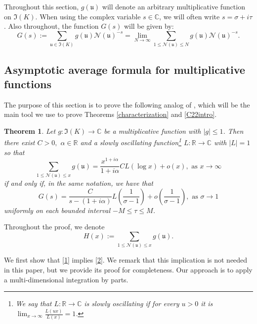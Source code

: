 \documentclass[11pt]{amsart}
\newtheorem{theorem}[lemma]{Theorem}
\theoremstyle{definition}
\newcommand{\C}{{\mathbb C}}
\newcommand{\NN}{{\mathcal N}}
\newcommand{\R}{{\mathbb R}}
\newcommand{\mf}{\mathfrak}
\newcommand{\WS}[1]{{\color{blue}{{#1}}}}
\begin{document}
Throughout this section, $g(\mathfrak{u})$ will denote an arbitrary multiplicative function on $\mathfrak{I}(K)$.%
When using the complex variable $s \in \C$, we will often write $s=\sigma+i\tau$.  Also throughout, the function $G(s)$  will be given by:
$$G(s):=\sum_{\mf{u}\in \mathfrak{I}(K)}g(\mf u)\NN(\mf u)^{-s} = \lim_{N \to \infty} \sum_{1\leq \NN(\mf u)\leq N } g(\mf u)\NN(\mf u)^{-s}.$$
 

 



\subsection{Asymptotic average formula for multiplicative functions}
The purpose of this section is to prove the following analog of \cite[Theorem~6.1]{E79book}, which will be the main tool we use to prove Theorems \ref{characterization} and \ref{C22intro}.

 \begin{theorem}\label{C21}
 Let $g\colon\mf I(K)\to\C$ be a multiplicative function with $\vert g\vert\leq 1$. Then there exist $C>0,$ $\alpha\in\R$ and a slowly oscillating function\footnote{We say that $L:\R \to \C$ is slowly oscillating if for every $u>0$ it is $\lim_{x \to \infty} \frac{L(ux)}{L(x)}=1$.} $L\colon \R\to \C$ with $\vert L\vert=1$ so that 
 \begin{equation}\label{1}
     \sum_{1\leq\NN(\mf u)\leq x}g(\mf u)=\frac{x^{1+i\alpha}}{1+i\alpha}CL(\log  x)+o(x), \text{ as }x\to\infty
 \end{equation}
if and only if, in the same notation, we have that  
  \begin{equation}\label{2}
     G(s)=\frac{C}{s-(1+i\alpha)}L\left(\frac{1}{\sigma-1}\right)+o\left(\frac{1}{\sigma-1}\right), \text{ as }\sigma\to 1
 \end{equation}
  uniformly on each bounded interval $-M\leq \tau\leq M$.
  \end{theorem}

Throughout the proof, we denote
$$H(x):=\sum_{1\leq \NN(\mf u)\leq x}g(\mf u).$$



We first show that \eqref{1} implies \eqref{2}. We remark that this implication is not needed in this paper, but we provide its proof for completeness. Our approach is to apply a multi-dimensional integration by parts.
  
\end{document}

